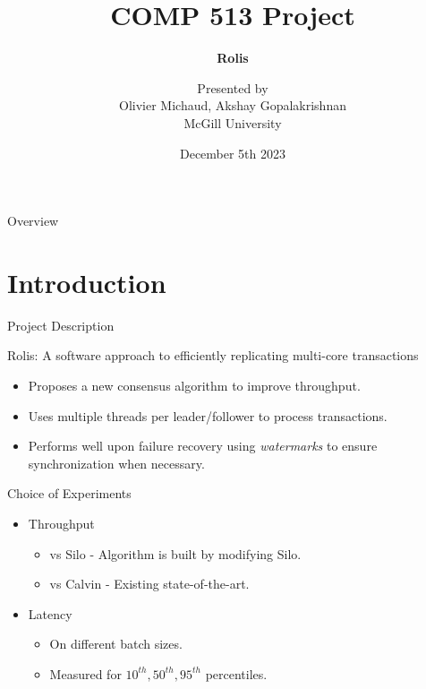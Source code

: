 \documentclass[notes, xcolor=dvipsnames]{beamer}
\title{COMP 513 Project}
\subtitle{\textbf{Rolis}}
\date{December 5th 2023}
\author{Presented by \\ Olivier Michaud, Akshay Gopalakrishnan \\ McGill University}
\begin{document}
    \begin{frame}

        \maketitle

    \end{frame}


    \begin{frame}{Overview}

        \tableofcontents
        
    \end{frame}


    \section{Introduction}

    \begin{frame}{Project Description}


        \begin{center}
            Rolis: A software approach to efficiently replicating multi-core transactions 
        \end{center}


        \begin{itemize}
            \item Proposes a new consensus algorithm to improve throughput. 
            \item Uses multiple threads per leader/follower to process transactions. 
            \item Performs well upon failure recovery using \textit{watermarks} to ensure synchronization when necessary.
        \end{itemize}

    \end{frame}

    \begin{frame}{Choice of Experiments}

        \begin{itemize}
            \item Throughput
            \begin{itemize}
                \item vs Silo - Algorithm is built by modifying Silo.  
                \item vs Calvin - Existing state-of-the-art. 
            \end{itemize}    
            \item Latency
            \begin{itemize}
                \item On different batch sizes.  
                \item Measured for $10^{th}, 50^{th}, 95^{th}$ percentiles.
            \end{itemize}         
        \end{itemize}
        
    \end{frame}
\end{document}
